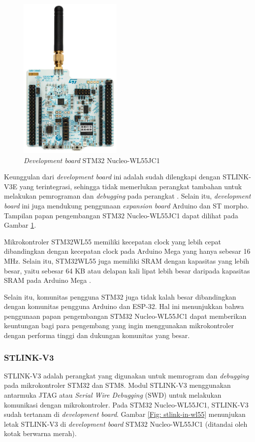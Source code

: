 \begin{figure}[ht]
	\centering
	\includegraphics[width=5cm]{contents/chapter-2/stm32-wl55jc1.jpg}
	\caption{\textit{Development board} STM32 Nucleo-WL55JC1}
	\label{Fig: STM32 Nucleo-WL55JC1}
\end{figure}

Keunggulan dari \textit{development board} ini adalah sudah dilengkapi dengan STLINK-V3E yang terintegrasi, sehingga tidak memerlukan perangkat tambahan untuk melakukan pemrograman dan \textit{debugging} pada perangkat \cite{STMicroelectronics2022}. Selain itu, \textit{development board} ini juga mendukung penggunaan \textit{expansion board} Arduino dan ST morpho. Tampilan papan pengembangan STM32 Nucleo-WL55JC1 dapat dilihat pada Gambar \ref{Fig: STM32 Nucleo-WL55JC1}.

Mikrokontroler STM32WL55 memiliki kecepatan clock yang lebih cepat dibandingkan dengan kecepatan clock pada Arduino Mega yang hanya sebesar 16 MHz. Selain itu, STM32WL55 juga memiliki SRAM dengan kapasitas yang lebih besar, yaitu sebesar 64 KB atau delapan kali lipat lebih besar daripada kapasitas SRAM pada Arduino Mega \cite{STMicroelectronics2022b}.

Selain itu, komunitas pengguna STM32 juga tidak kalah besar dibandingkan dengan komunitas pengguna Arduino dan ESP-32. Hal ini menunjukkan bahwa penggunaan papan pengembangan STM32 Nucleo-WL55JC1 dapat memberikan keuntungan bagi para pengembang yang ingin menggunakan mikrokontroler dengan performa tinggi dan dukungan komunitas yang besar.

\subsubsection{STLINK-V3}
STLINK-V3 adalah perangkat yang digunakan untuk memrogram dan \textit{debugging} pada mikrokontroler STM32 dan STM8. Modul STLINK-V3 menggunakan antarmuka JTAG atau \textit{Serial Wire Debugging} (SWD) untuk melakukan komunikasi dengan mikrokontroler. Pada STM32 Nucleo-WL55JC1, STLINK-V3 sudah tertanam di \textit{development board}. Gambar \ref{Fig: stlink-in-wl55} menunjukan letak STLINK-V3 di \textit{development board} STM32 Nucleo-WL55JC1 (ditandai oleh kotak berwarna merah).

